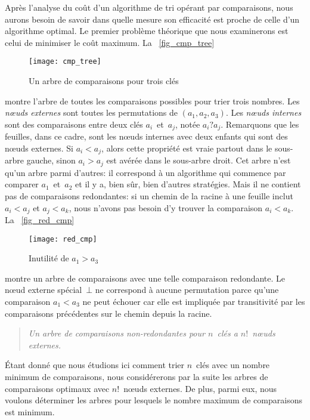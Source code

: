 Après l'analyse du coût d'un algorithme de tri opérant par
comparaisons, nous aurons besoin de savoir dans quelle mesure son
efficacité est proche de celle d'un algorithme
optimal. Le premier problème théorique que
nous examinerons est celui de minimiser le coût maximum. La
\fig~\vref{fig_cmp_tree}
\begin{figure}
\centering
\texttt{[image: cmp\_tree]}
\caption{Un arbre de comparaisons pour trois clés\label{fig_cmp_tree}}
\end{figure}
montre l'arbre de toutes les comparaisons possibles
 pour trier trois
nombres. Les \emph{n{\oe}uds externes}
\label{def_external_node} sont toutes les
permutations de \((a_1,a_2,a_3)\). Les
\emph{n{\oe}uds internes} sont
des comparaisons entre deux clés \(a_i\)~et~\(a_j\), notée
\(a_i?a_j\). Remarquons que les feuilles, dans ce cadre, sont les
n{\oe}uds internes avec deux enfants qui sont des n{\oe}uds externes.
Si \({a_i < a_j}\), alors cette propriété est vraie partout dans le
sous-arbre gauche, sinon \({a_i > a_j}\) est avérée dans le sous-arbre
droit. Cet arbre n'est qu'un arbre parmi d'autres: il correspond à un
algorithme qui commence par comparer \(a_1\)~et~\(a_2\) et il y a,
bien sûr, bien d'autres stratégies. Mais il ne contient pas de
comparaisons redondantes: si un chemin de la racine à une feuille
inclut \({a_i < a_j}\) et \({a_j < a_k}\), nous n'avons pas besoin d'y
trouver la comparaison \({a_i < a_k}\). La \fig~\vref{fig_red_cmp}
\begin{figure}
\centering
\texttt{[image: red\_cmp]}
\caption{Inutilité de \(a_1 > a_3\)\label{fig_red_cmp}}
\end{figure}
montre un arbre de comparaisons avec une telle comparaison
redondante. Le n{\oe}ud externe spécial~\(\bot\) ne correspond à
aucune permutation parce qu'une comparaison \({a_1 < a_3}\) ne peut
échouer car elle est impliquée par transitivité par les comparaisons
précédentes sur le chemin depuis la racine.
\begin{quote}
  \emph{Un arbre de comparaisons non-redondantes pour \(n\)~clés
    a \(n!\)~n{\oe}uds externes.}
\end{quote}
Étant donné que nous étudions ici comment trier \(n\)~clés avec un
nombre minimum de comparaisons, nous considérerons par la suite les
arbres de comparaisons optimaux avec \(n!\)~n{\oe}uds externes. De
plus, parmi eux, nous voulons déterminer les arbres pour lesquels le
nombre maximum de comparaisons est minimum.

